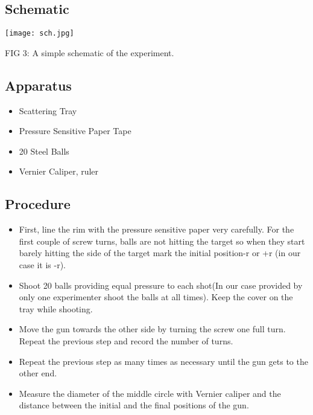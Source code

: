 \documentclass[a4paper]{article}
\begin{document}
\begin{multicols}{2}
\subsection{Schematic}

\begin{center}

\texttt{[image: sch.jpg]}

FIG 3: A simple schematic of the experiment.
\end{center}

\subsection{Apparatus}

\begin{itemize}

\item Scattering Tray
\item Pressure Sensitive Paper Tape
\item 20 Steel Balls
\item Vernier Caliper, ruler

\end{itemize}

\subsection{Procedure} 

\begin{itemize}
\item First, line the rim with the pressure sensitive paper very carefully. For the first couple of screw turns, balls are not hitting the target so when they start barely hitting the side of the target mark the initial position-r or +r (in our case it is -r).
\item Shoot 20 balls providing equal pressure to each shot(In our case provided by only one experimenter shoot the balls at all times). Keep the cover on the tray while shooting.
\item Move the gun towards the other side by turning the screw one full turn. Repeat the previous step and record the number of turns.
\item Repeat the previous step as many times as necessary until the gun gets to the other end.
\item Measure the diameter of the middle circle with Vernier caliper and the distance between the initial and the final positions of the gun.
\end{itemize}


\end{multicols}
\end{document}
